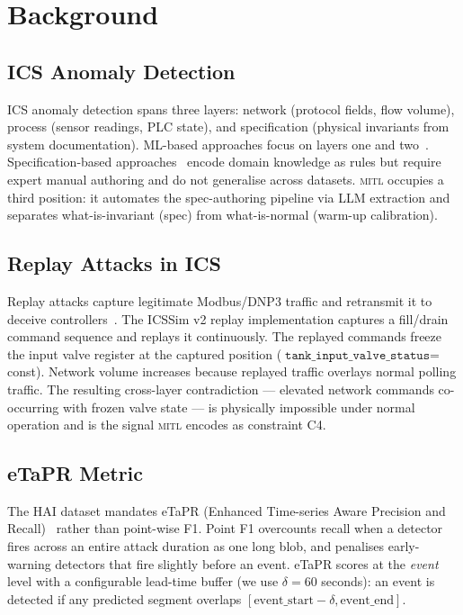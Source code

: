\documentclass[sigconf,anonymous,review]{acmart}
\newcommand{\mitl}{\textsc{mitl}\xspace}
\begin{document}
\section{Background}
\label{sec:background}

\subsection{ICS Anomaly Detection}
ICS anomaly detection spans three layers: network (protocol fields, flow
volume), process (sensor readings, PLC state), and specification
(physical invariants from system documentation).  ML-based approaches focus
on layers one and two~\cite{Goh2017,Aoudi2018,Ahmed2018}.  Specification-based
approaches~\cite{Adepu2018,Feng2019} encode domain knowledge as rules but
require expert manual authoring and do not generalise across datasets.
\mitl occupies a third position: it automates the spec-authoring pipeline
via LLM extraction and separates what-is-invariant (spec) from what-is-normal
(warm-up calibration).

\subsection{Replay Attacks in ICS}
Replay attacks capture legitimate Modbus/DNP3 traffic and retransmit it to
deceive controllers~\cite{Mo2009}.  The ICSSim v2 replay implementation
captures a fill/drain command sequence and replays it continuously.  The
replayed commands freeze the input valve register at the captured position
($\texttt{tank\_input\_valve\_status} = $ const).  Network volume increases
because replayed traffic overlays normal polling traffic.  The resulting
cross-layer contradiction — elevated network commands co-occurring with frozen
valve state — is physically impossible under normal operation and is the
signal \mitl encodes as constraint C4.

\subsection{eTaPR Metric}
The HAI dataset mandates eTaPR (Enhanced Time-series Aware Precision and
Recall)~\cite{Hwang2021} rather than point-wise F1.  Point F1 overcounts
recall when a detector fires across an entire attack duration as one long
blob, and penalises early-warning detectors that fire slightly before an
event.  eTaPR scores at the \emph{event} level with a configurable lead-time
buffer (we use $\delta = 60$ seconds): an event is detected if any predicted
segment overlaps $[\text{event\_start} - \delta, \text{event\_end}]$.
\end{document}
